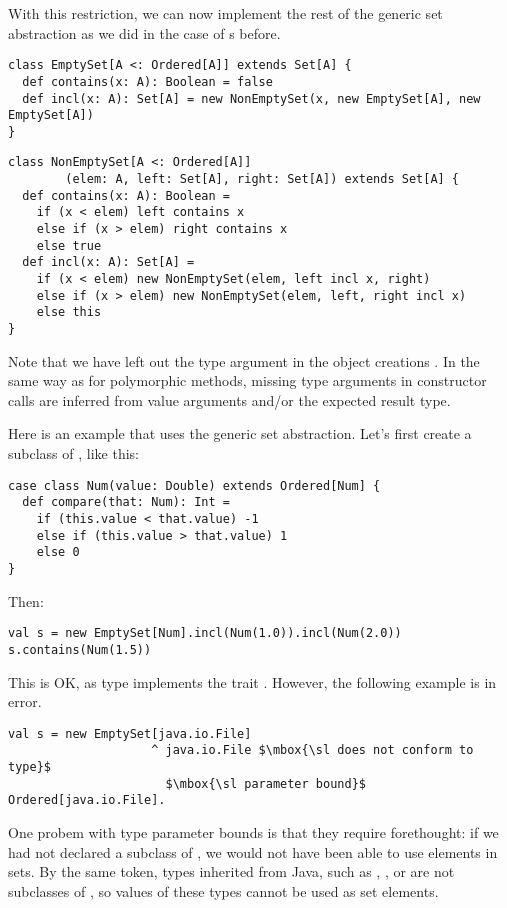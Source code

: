 With this restriction, we can now implement the rest of the generic
set abstraction as we did in the case of s before.

\begin{lstlisting}
class EmptySet[A <: Ordered[A]] extends Set[A] {
  def contains(x: A): Boolean = false
  def incl(x: A): Set[A] = new NonEmptySet(x, new EmptySet[A], new EmptySet[A])
}
\end{lstlisting}

\begin{lstlisting}
class NonEmptySet[A <: Ordered[A]]
        (elem: A, left: Set[A], right: Set[A]) extends Set[A] {
  def contains(x: A): Boolean =
    if (x < elem) left contains x
    else if (x > elem) right contains x
    else true
  def incl(x: A): Set[A] =
    if (x < elem) new NonEmptySet(elem, left incl x, right)
    else if (x > elem) new NonEmptySet(elem, left, right incl x)
    else this
}
\end{lstlisting}
Note that we have left out the type argument in the object creations
. In the same way as for polymorphic methods,
missing type arguments in constructor calls are inferred from value
arguments and/or the expected result type.

Here is an example that uses the generic set abstraction. Let's first
create a subclass of \lstinline@Ordered@, like this:
\begin{lstlisting}
case class Num(value: Double) extends Ordered[Num] {
  def compare(that: Num): Int =
    if (this.value < that.value) -1
    else if (this.value > that.value) 1
    else 0
}
\end{lstlisting}
Then:
\begin{lstlisting}
val s = new EmptySet[Num].incl(Num(1.0)).incl(Num(2.0))
s.contains(Num(1.5))
\end{lstlisting}
This is OK, as type  implements the trait .
However, the following example is in error.
\begin{lstlisting}
val s = new EmptySet[java.io.File]
                    ^ java.io.File $\mbox{\sl does not conform to type}$
                      $\mbox{\sl parameter bound}$ Ordered[java.io.File].
\end{lstlisting}
One probem with type parameter bounds is that they require
forethought: if we had not declared \lstinline@Num@ a subclass of
\lstinline@Ordered@, we would not have been able to use \lstinline@Num@
elements in sets. By the same token, types inherited from Java, 
such as \lstinline@Int@, \lstinline@Double@, or
\lstinline@String@ are not subclasses of \lstinline@Ordered@, so
values of these types cannot be used as set elements.


